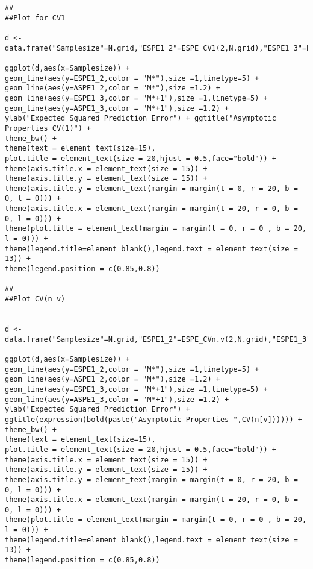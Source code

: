 \documentclass[Research_Module_ES.tex]{subfiles}
\begin{document}
\begin{lstlisting}[title={Simulation Graphic Ilustration ESPE CV1 and CV($n_\nu$)}]
##--------------------------------------------------------------------
##Plot for CV1

d <- data.frame("Samplesize"=N.grid,"ESPE1_2"=ESPE_CV1(2,N.grid),"ESPE1_3"=ESPE_CV1(3,N.grid),"ASPE1_2"=CV1_d2,"ASPE1_3"=CV1_d3)

ggplot(d,aes(x=Samplesize)) +
geom_line(aes(y=ESPE1_2,color = "M*"),size =1,linetype=5) +
geom_line(aes(y=ASPE1_2,color = "M*"),size =1.2) +
geom_line(aes(y=ESPE1_3,color = "M*+1"),size =1,linetype=5) +
geom_line(aes(y=ASPE1_3,color = "M*+1"),size =1.2) +
ylab("Expected Squared Prediction Error") + ggtitle("Asymptotic Properties CV(1)") +
theme_bw() +
theme(text = element_text(size=15),
plot.title = element_text(size = 20,hjust = 0.5,face="bold")) +
theme(axis.title.x = element_text(size = 15)) +
theme(axis.title.y = element_text(size = 15)) +
theme(axis.title.y = element_text(margin = margin(t = 0, r = 20, b = 0, l = 0))) +
theme(axis.title.x = element_text(margin = margin(t = 20, r = 0, b = 0, l = 0))) +
theme(plot.title = element_text(margin = margin(t = 0, r = 0 , b = 20, l = 0))) +
theme(legend.title=element_blank(),legend.text = element_text(size = 13)) +
theme(legend.position = c(0.85,0.8))

##--------------------------------------------------------------------
##Plot CV(n_v)


d <- data.frame("Samplesize"=N.grid,"ESPE1_2"=ESPE_CVn.v(2,N.grid),"ESPE1_3"=ESPE_CVn.v(3,N.grid),"ASPE1_2"=MCCV1_d2,"ASPE1_3"=MCCV1_d3)

ggplot(d,aes(x=Samplesize)) +
geom_line(aes(y=ESPE1_2,color = "M*"),size =1,linetype=5) +
geom_line(aes(y=ASPE1_2,color = "M*"),size =1.2) +
geom_line(aes(y=ESPE1_3,color = "M*+1"),size =1,linetype=5) +
geom_line(aes(y=ASPE1_3,color = "M*+1"),size =1.2) +
ylab("Expected Squared Prediction Error") + ggtitle(expression(bold(paste("Asymptotic Properties ",CV(n[v]))))) +
theme_bw() +
theme(text = element_text(size=15),
plot.title = element_text(size = 20,hjust = 0.5,face="bold")) +
theme(axis.title.x = element_text(size = 15)) +
theme(axis.title.y = element_text(size = 15)) +
theme(axis.title.y = element_text(margin = margin(t = 0, r = 20, b = 0, l = 0))) +
theme(axis.title.x = element_text(margin = margin(t = 20, r = 0, b = 0, l = 0))) +
theme(plot.title = element_text(margin = margin(t = 0, r = 0 , b = 20, l = 0))) +
theme(legend.title=element_blank(),legend.text = element_text(size = 13)) +
theme(legend.position = c(0.85,0.8))
\end{lstlisting}
\end{document}
